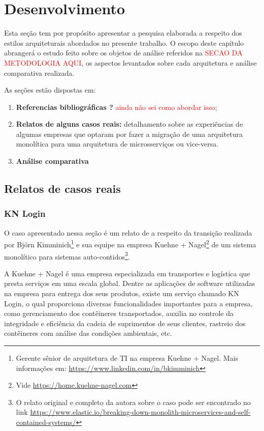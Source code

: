 \chapter{Desenvolvimento}

Esta seção tem por propósito apresentar a pesquisa elaborada a respeito dos estilos arquiteturais
abordados no presente trabalho. O escopo deste capítulo abrangerá o estudo feito sobre os objetos de
análise referidos na \textcolor{red}{SECAO DA METODOLOGIA AQUI}, os aspectos levantados sobre cada
arquitetura e análise comparativa realizada.

As seções estão dispostas em:

  \begin{enumerate}
    \item \textbf{Referencias bibliográficas ?} \textcolor{red}{ainda não sei como abordar isso};
    \item \textbf{Relatos de alguns casos reais:} detalhamento sobre as experiências de algumas empresas
    que optaram por fazer a migração de uma arquitetura monolítica para uma arquitetura de
    microsserviços ou vice-versa.
    \item \textbf{Análise comparativa}
  \end{enumerate}

\section{Relatos de casos reais}
\subsection{KN Login}
\label{sec:KNLogin}

O caso apresentado nessa seção é um relato de  a respeito
da transição realizada por Björn Kimminich\footnote{Gerente sênior de arquitetura de TI na empresa
Kuehne + Nagel. Mais informações em: \url{https://www.linkedin.com/in/bkimminich}} e sua equipe na empresa
Kuehne + Nagel\footnote{Vide \url{https://home.kuehne-nagel.com}} de um sistema monolítico para sistemas
auto-contidos\footnote{O relato original e completo da autora sobre o caso pode ser encontrado no link
\url{https://www.elastic.io/breaking-down-monolith-microservices-and-self-contained-systems/}}. 

A Kuehne + Nagel é uma empresa especializada em transportes e logística que presta serviços em uma
escala global. Dentre as aplicações de software utilizadas na empresa para entrega dos seus
produtos, existe um serviço chamado KN Login, o qual proporciona diversas funcionalidades
importantes para a empresa, como gerenciamento dos contêineres transportados, auxilia no controle da
integridade e eficiência da cadeia de suprimentos de seus clientes, rastreio dos contêineres com
análise das condições ambientais, etc.

